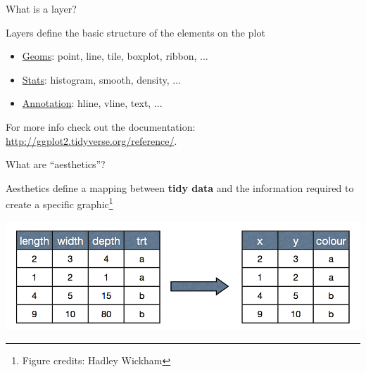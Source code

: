 \documentclass[table]{beamer}\usepackage[]{graphicx}\usepackage[]{color}
\begin{document}

\begin{frame}[fragile]{What is a layer?}


\begin{block}{Layers define the basic structure of the elements on the plot}
\begin{itemize}
    \item \href{https://ggplot2.tidyverse.org/reference/#section-geoms}{Geoms}: point, line, tile, boxplot, ribbon, ...
    \item \href{https://ggplot2.tidyverse.org/reference/#section-stats}{Stats}: histogram, smooth, density, ...
    \item \href{https://ggplot2.tidyverse.org/reference/#section-annotations}{Annotation}: hline, vline, text, ...
\end{itemize}

For more info check out the documentation: \href{http://ggplot2.tidyverse.org/reference/}{http://ggplot2.tidyverse.org/reference/}.

\end{block}

\end{frame}


\begin{frame}[fragile]{What are ``aesthetics''?}

Aesthetics define a mapping between {\bf tidy data} and the information required to create a specific graphic\footnote{Figure credits: Hadley Wickham}

\includegraphics[width=\textwidth]{figure-static/aes.png}

\end{frame}


\end{document}
